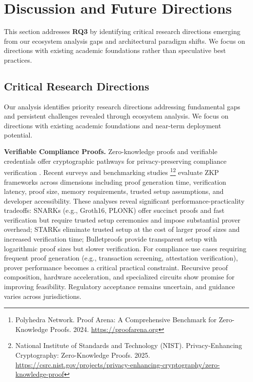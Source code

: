 \section{Discussion and Future Directions}
\label{sec:discussion}

This section addresses \textbf{RQ3} by identifying critical research directions emerging from our ecosystem analysis gaps and architectural paradigm shifts. We focus on directions with existing academic foundations rather than speculative best practices.

\subsection{Critical Research Directions}

Our analysis identifies priority research directions addressing fundamental gaps and persistent challenges revealed through ecosystem analysis. We focus on directions with existing academic foundations and near-term deployment potential.

\noindent\textbf{Verifiable Compliance Proofs.}
Zero-knowledge proofs and verifiable credentials offer cryptographic pathways for privacy-preserving compliance verification \cite{ben-sasson2017scalablezeroknowledge,yang2024researchidentitydata,zhang2024blockchainzeroknowledge}. Recent surveys and benchmarking studies \footnote{Polyhedra Network. Proof Arena: A Comprehensive Benchmark for Zero-Knowledge Proofs. 2024. \url{https://proofarena.org}}\footnote{National Institute of Standards and Technology (NIST). Privacy-Enhancing Cryptography: Zero-Knowledge Proofs. 2025. \url{https://csrc.nist.gov/projects/privacy-enhancing-cryptography/zero-knowledge-proof}} evaluate ZKP frameworks across dimensions including proof generation time, verification latency, proof size, memory requirements, trusted setup assumptions, and developer accessibility. These analyses reveal significant performance-practicality tradeoffs: SNARKs (e.g., Groth16, PLONK) offer succinct proofs and fast verification but require trusted setup ceremonies and impose substantial prover overhead; STARKs eliminate trusted setup at the cost of larger proof sizes and increased verification time; Bulletproofs provide transparent setup with logarithmic proof sizes but slower verification. For compliance use cases requiring frequent proof generation (e.g., transaction screening, attestation verification), prover performance becomes a critical practical constraint. Recursive proof composition, hardware acceleration, and specialized circuits show promise for improving feasibility. Regulatory acceptance remains uncertain, and guidance varies across jurisdictions.

